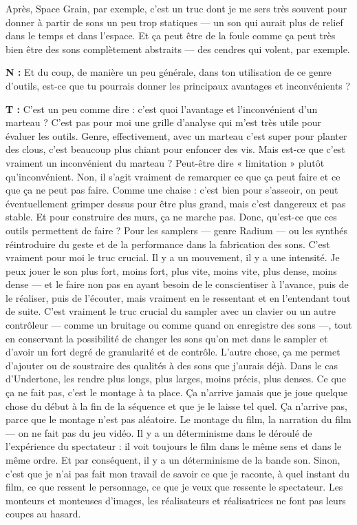 ﻿\documentclass[12pt]{article}
\begin{document}
Après, Space Grain, par exemple, c'est un truc dont je me sers très souvent pour donner à partir de sons un peu trop statiques — un son qui aurait plus de relief dans le temps et dans l'espace. Et ça peut être de la foule comme ça peut très bien être des sons complètement abstraits — des cendres qui volent, par exemple. 


\textbf{N :} Et du coup, de manière un peu générale, dans ton utilisation de ce genre d'outils, est-ce que tu pourrais donner les principaux avantages et inconvénients ? 

\textbf{T :} C'est un peu comme dire : c'est quoi l'avantage et l'inconvénient d'un marteau ? C'est pas pour moi une grille d'analyse qui m'est très utile pour évaluer les outils. Genre, effectivement, avec un marteau c'est super pour planter des clous, c'est beaucoup plus chiant pour enfoncer des vis. Mais est-ce que c'est vraiment un inconvénient du marteau ? Peut-être dire « limitation » plutôt qu'inconvénient. Non, il s'agit vraiment de remarquer ce que ça peut faire et ce que ça ne peut pas faire. Comme une chaise : c'est bien pour s'asseoir, on peut éventuellement grimper dessus pour être plus grand, mais c'est dangereux et pas stable. Et pour construire des murs, ça ne marche pas. 
Donc, qu'est-ce que ces outils permettent de faire ? Pour les samplers — genre Radium — ou les synthés réintroduire du geste et de la performance dans la fabrication des sons. C'est vraiment pour moi le truc crucial. Il y a un mouvement, il y a une intensité. Je peux jouer le son plus fort, moins fort, plus vite, moins vite, plus dense, moins dense — et le faire non pas en ayant besoin de le conscientiser à l'avance, puis de le réaliser, puis de l'écouter, mais vraiment en le ressentant et en l'entendant tout de suite. C'est vraiment le truc crucial du sampler avec un clavier ou un autre contrôleur — comme un bruitage ou comme quand on enregistre des sons —, tout en conservant la possibilité de changer les sons qu'on met dans le sampler et d'avoir un fort degré de granularité et de contrôle. 
L'autre chose, ça me permet d'ajouter ou de soustraire des qualités à des sons que j'aurais déjà. Dans le cas d'Undertone, les rendre plus longs, plus larges, moins précis, plus denses. 
Ce que ça ne fait pas, c'est le montage à ta place. Ça n'arrive jamais que je joue quelque chose du début à la fin de la séquence et que je le laisse tel quel. Ça n'arrive pas, parce que le montage n'est pas aléatoire. Le montage du film, la narration du film — on ne fait pas du jeu vidéo. Il y a un déterminisme dans le déroulé de l'expérience du spectateur : il voit toujours le film dans le même sens et dans le même ordre. Et par conséquent, il y a un déterminisme de la bande son. Sinon, c'est que je n'ai pas fait mon travail de savoir ce que je raconte, à quel instant du film, ce que ressent le personnage, ce que je veux que ressente le spectateur. Les monteurs et monteuses d'images, les réalisateurs et réalisatrices ne font pas leurs coupes au hasard. 
\end{document}
